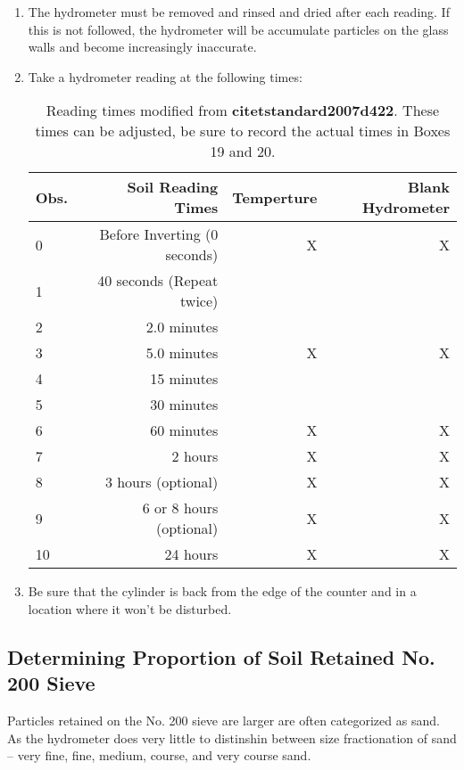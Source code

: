 \documentclass[12pt]{../SOP3_alpha}
\begin{document}
\begin{enumerate}
		\item The hydrometer must be removed and rinsed and dried after each reading. If this is not followed, the hydrometer will be accumulate particles on the glass walls and become increasingly inaccurate. 

	\item Take a hydrometer reading at the following times:
	
		\begin{table}
		\begin{tabular}{lrrr}\hline
Obs. & Soil Reading Times 		& Temperture		& Blank Hydrometer \\ \hline\hline	
0		& Before Inverting (0 seconds)		&	 X	&		X		\\
1		& 40 seconds (Repeat twice) 			&	 		&			  \\
2		&	2.0 minutes 										&			&       \\
3		&	5.0 minutes 										&	 X 	&		X   \\
4		&	15 minutes 											&	 		&   	  \\
5	 	& 30 minutes 											&			&				\\
6		& 60 minutes 											&		X	& 	X		\\
7		& 2	hours													& 	X	& 	X		\\
8		& 3 hours (optional)							&		X	& 	X		\\
9   & 6 or 8 hours (optional)					&		X	& 	X		\\
10		& 24 hours											&		X	&  	X 	\\\hline		
		\end{tabular}
		\caption{Reading times modified from \textbf{citet{standard2007d422}}. These times can be adjusted, be sure to record the actual times in Boxes 19 and 20.}
		\label{tab:ReadingTimes}
	\end{table}
	
	\item Be sure that the cylinder is back from the edge of the counter and in a location where it won't be disturbed.	
	
\end{enumerate}

\subsection*{Determining Proportion of Soil Retained No. 200 Sieve}

\NP Particles retained on the No. 200 sieve are larger are often categorized as sand. As the hydrometer does very little to distinshin between size fractionation of sand -- very fine, fine, medium, course, and very course sand. 
\end{document}
